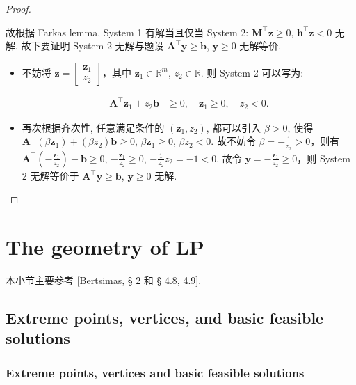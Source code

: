 \begin{exampleblock}{}
\begin{proof}{}
\begin{itemize}
\end{itemize}

故根据 Farkas lemma, System 1 有解当且仅当 System 2: $\bm{M}^\top \bm{z} \geq 0$, $\bm{h}^\top \bm{z} < 0$ 无解. 故下要证明 System 2 无解与题设 $\bm{A}^\top \bm{y} \geq \bm{b}$, $\bm{y} \geq 0$ 无解等价.

\begin{itemize}
\item {}不妨将 $\bm{z} = \begin{bmatrix} \bm{z}_1 \\ z_2 \end{bmatrix}$，其中 $\bm{z}_1 \in \mathbb{R}^m$, $z_2 \in \mathbb{R}$. 则 System 2 可以写为:

\[
\begin{aligned}
  \bm{A}^\top \bm{z}_1 + z_2 \bm{b} &\geq 0, \quad \bm{z}_1 \geq 0,\quad z_2 < 0.
\end{aligned}
\]


\item {}再次根据齐次性, 任意满足条件的 $(\bm{z}_1, z_2)$, 都可以引入 $\beta > 0$, 使得 $\bm{A}^\top (\beta \bm{z}_1) + (\beta z_2) \bm{b} \geq 0$, $\beta \bm{z}_1 \geq 0$, $\beta z_2 < 0$. 故不妨令 $\beta = -\frac{1}{z_2} > 0$，则有 $\bm{A}^\top (-\frac{\bm{z}_1}{z_2}) - \bm{b} \geq 0$, $-\frac{\bm{z}_1}{z_2} \geq 0$, $-\frac{1}{z_2} z_2 = -1 < 0$. 故令 $\bm{y} = -\frac{\bm{z}_1}{z_2} \geq 0$，则 System 2 无解等价于 $\bm{A}^\top \bm{y} \geq \bm{b}$, $\bm{y} \geq 0$ 无解.


\end{itemize}

\end{proof}

\end{exampleblock}

\section{The geometry of LP}

本小节主要参考 [Bertsimas, § 2 和 § 4.8, 4.9].

\subsection{Extreme points, vertices, and basic feasible solutions}

\subsubsection{Extreme points, vertices and basic feasible solutions}


